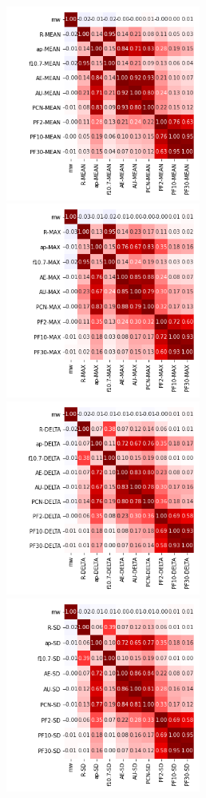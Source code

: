 \documentclass[12pt]{article}
\begin{document}
\newpage


\begin{figure}
   \includegraphics[width=0.57\textwidth]{all_mean_3.png}
   \includegraphics[width=0.57\textwidth]{all_max_3.png}
   \includegraphics[width=0.57\textwidth]{all_delta_3.png}
   \includegraphics[width=0.57\textwidth]{all_sd_3.png}
\end{figure}
\end{document}

